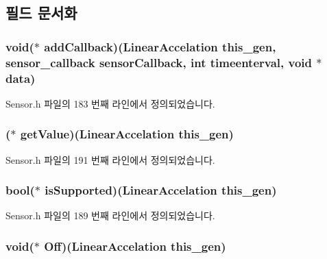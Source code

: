\subsection{필드 문서화}
\hypertarget{struct___linear_accelation_a8951a1ec6ac7c7aea7f13701f0179f7e}{
\subsubsection[{add\-Callback}]{\setlength{\rightskip}{0pt plus 5cm}void($\ast$  add\-Callback)({\bf Linear\-Accelation} this\-\_\-gen, {\bf sensor\-\_\-callback} sensor\-Callback, int timeenterval, void $\ast$data)}}\label{struct___linear_accelation_a8951a1ec6ac7c7aea7f13701f0179f7e}


Sensor.\-h 파일의 183 번째 라인에서 정의되었습니다.

\hypertarget{struct___linear_accelation_aaf02870c60aa510568b3376a4cd4d965}{
\subsubsection[{get\-Value}]{($\ast$  get\-Value)({\bf Linear\-Accelation} this\-\_\-gen)}}\label{struct___linear_accelation_aaf02870c60aa510568b3376a4cd4d965}


Sensor.\-h 파일의 191 번째 라인에서 정의되었습니다.

\hypertarget{struct___linear_accelation_afc42a6003589d08871b06adfc3f2ee9c}{
\subsubsection[{is\-Supported}]{\setlength{\rightskip}{0pt plus 5cm}bool($\ast$  is\-Supported)({\bf Linear\-Accelation} this\-\_\-gen)}}\label{struct___linear_accelation_afc42a6003589d08871b06adfc3f2ee9c}


Sensor.\-h 파일의 189 번째 라인에서 정의되었습니다.

\hypertarget{struct___linear_accelation_a5ecc7fba6af596a66129373e0157f9a2}{
\subsubsection[{Off}]{\setlength{\rightskip}{0pt plus 5cm}void($\ast$  Off)({\bf Linear\-Accelation} this\-\_\-gen)}}\label{struct___linear_accelation_a5ecc7fba6af596a66129373e0157f9a2}



